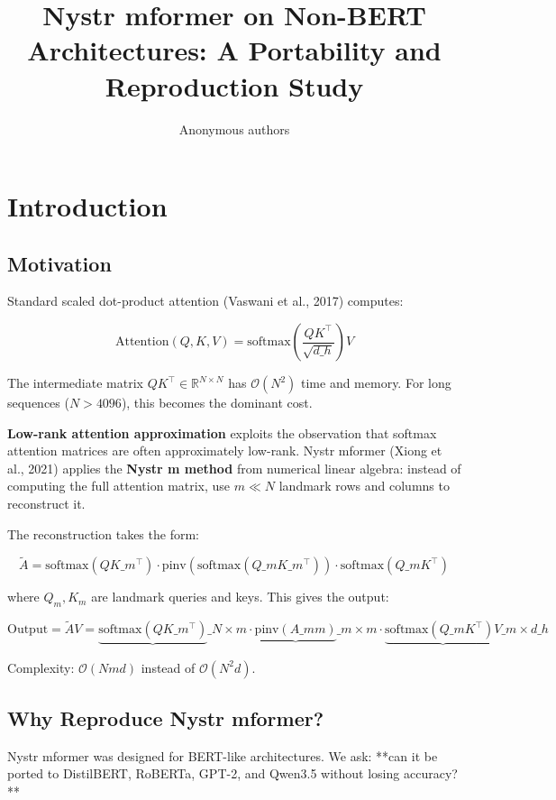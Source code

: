 \title{\textbf{Nystr mformer on Non-BERT Architectures: A Portability and Reproduction Study}}

\author{Anonymous authors}



\section{Introduction}

\subsection{Motivation}

Standard scaled dot-product attention (Vaswani et al., 2017) computes:

\[
\mathrm{Attention}(Q, K, V) = \mathrm{softmax}\!\left(\frac{Q K^\top}{\sqrt{d\_h}}\right) V
\tag{1.1}
\]

The intermediate matrix $Q K^\top \in \mathbb{R}^{N \times N}$ has 
$\mathcal{O}(N^2)$ time and memory. For long sequences ($N > 4096$), this 
becomes the dominant cost.

\textbf{Low-rank attention approximation} exploits the observation that softmax 
attention matrices are often approximately low-rank. Nystr mformer (Xiong 
et al., 2021) applies the \textbf{Nystr m method} from numerical linear algebra: 
instead of computing the full attention matrix, use $m \ll N$ landmark 
rows and columns to reconstruct it.

The reconstruction takes the form:

\[
\tilde{A} = \text{softmax}(Q K\_m^\top) \cdot \text{pinv}(\text{softmax}(Q\_m K\_m^\top)) \cdot \text{softmax}(Q\_m K^\top)
\tag{1.2}
\]

where $Q_m, K_m$ are landmark queries and keys. This gives the output:

\[
\text{Output} = \tilde{A} V = \underbrace{\text{softmax}(Q K\_m^\top)}\_{N \times m} \cdot \underbrace{\text{pinv}(A\_{mm})}\_{m \times m} \cdot \underbrace{\text{softmax}(Q\_m K^\top) V}\_{m \times d\_h}
\tag{1.3}
\]

Complexity: $\mathcal{O}(N m d)$ instead of $\mathcal{O}(N^2 d)$.

\subsection{Why Reproduce Nystr mformer?}

Nystr mformer was designed for BERT-like architectures. We ask: **can it 
be ported to DistilBERT, RoBERTa, GPT-2, and Qwen3.5 without losing 
accuracy?**

